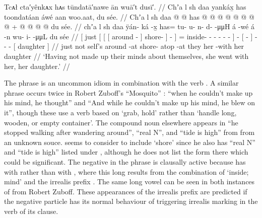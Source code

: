 \ex\label{ex:91-129-undecided-leave-with-daughter}%
%
\begingl
	\glpreamble	Tcᴀł cta′yênkᴀx hᴀs tūndatā′nawe ān wuā′t dusī′. //
	\glpreamble	Chʼa l sh daa yankáx̱ has toondatáan áwé aan woo.aat, du sée. //
	\gla	{} Chʼa l {} {} {} sh daa @ {} {}  @ {} {} {} {}
			has @  @ {} @ {} @ {} @ {} @ {} @ {} {}
			 @ {} +
		{}  @ {} {}  @ {} @ {} @ {}
		{} du sée. {} //
	\glb	{} chʼa l {} {} {} sh daa {} {} ÿán- ká {} -x̱ {}
			has= tu- u- n- d-  -μμH {} {} á -wé
		{} á -n {} wu- i-  -μμL
		{} du sée {} //
	\glc	{}[ just 
			{}[ {}[ {}[  around - {}]
				shore-  {}] - {}]
			= inside- - - -
				 - - {}]  -
		{}[  - {}]
		- -  -
		{}[  daughter {}] //
	\gld	{} just not {} {} {} self’s around -at {} shore- atop {} -at {}
			they  {} {} {} {} {} {} {}
			 {}
		{} her -with {}  {} {} {}
		{} her daughter {} //
	\glft	‘Having not made up their minds about themselves, she went with her, her daughter.’
		//
\endgl
\xe

The phrase  is an uncommon idiom in combination with the verb .
A similar phrase occurs twice in  Robert Zuboff’s “Mosquito” \parencite[78 lines 118 \&\ 120]{dauenhauer:1987}:  “when he couldn’t make up his mind, he thought” and  “And while he couldn’t make up his mind, he blew on it”, though these use a verb based on  ‘grab, hold’ rather than  ‘handle long, wooden, or empty container’.
The  compound noun elsewhere appears in  “he stopped walking after wandering around”,  “real N”, and  “tide is high” from \textcite[f06/8]{leer:1973} from an unknown souce.
\citeauthor{leer:1976} seems to consider  to include  ‘shore’ since he also has  “real N” and  “tide is high” listed under  \parencite[03/139]{leer:1973}, although he does not list the  form there which could be significant.
The negative  in the phrase  is clausally active because \citeauthor{swanton:1909} has  with  rather than  with , where this long  results from the combination of  ‘inside; mind’ and the irrealis prefix .
The same long vowel can be seen in both instances of  from  Robert Zuboff.
These appearances of the irrealis prefix  are predicted if the negative particle  has its normal behaviour of triggering irrealis marking in the verb of its clause.

